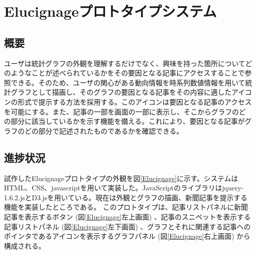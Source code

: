 \documentclass{matsushita-zemi}
\begin{document}

\section{Elucignageプロトタイプシステム}
\subsection{概要}
ユーザは統計グラフの外観を理解するだけでなく、興味を持った箇所についてどのようなことが述べられているかをその要因となる記事にアクセスすることで参照できる。そのため、ユーザの関心がある動向情報を時系列数値情報を用いて統計グラフとして描画し、そのグラフの要因となる記事をその内容に適したアイコンの形式で提示する方法を採用する。このアイコンは要因となる記事のアクセスを可能にする。また、記事の一部を画面の一部に表示し、そこからグラフのどの部分に該当しているかを示す機能を備える。これにより、要因となる記事がグラフのどの部分で記述されたものであるかを確認できる\cite{Elucignage-jsai}\cite{Elucignage}。
\subsection{進捗状況}
試作したElucignageプロトタイプの外観を図\ref{Elucignage}に示す。システムはHTML、CSS、javascriptを用いて実装した。JavaScriptのライブラリはjquery-1.6.2.jsとD3.jsを用いている。現在は外観とグラフの描画、新聞記事を提示する機能を実装したところである。
このプロトタイプは、記事リストパネルに新聞記事を表示するボタン (図\ref{Elucignage}左上画面) 、記事のスニペットを表示する記事リストパネル (図\ref{Elucignage}左下画面) 、グラフとそれに関連する記事へのポインタであるアイコンを表示するグラフパネル (図\ref{Elucignage}右上画面) から構成される。
\end{document}
